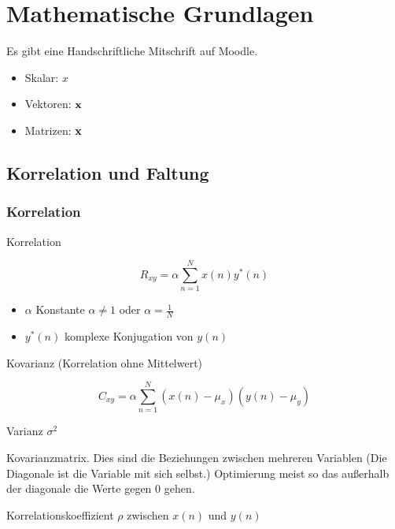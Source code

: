 \documentclass[a4paper]{article}
\title{\docTitle}
\author{Moritz}
\date{\today}
\begin{document}
\maketitle
\tableofcontents


\section{Mathematische Grundlagen}

Es gibt eine Handschriftliche Mitschrift auf Moodle.

\begin{itemize}
    \item Skalar: $x$
    \item Vektoren: $\mathbf{x}$
    \item Matrizen: $\mathbf{x}$
\end{itemize}

\subsection{Korrelation und Faltung}

\subsubsection{Korrelation}


Korrelation

$$R_{xy} = \alpha \sum_{n=1}^{N} x(n) y^*(n)$$

\begin{itemize}
    \item $\alpha$ Konstante $\alpha \neq 1$ oder $\alpha = \frac{1}{N}$
    \item $y^*(n)$ komplexe Konjugation von $y(n)$
\end{itemize}

Kovarianz (Korrelation ohne Mittelwert)

$$C_{xy} = \alpha \sum_{n=1}^{N} (x(n) -\mu_x)(y(n)-\mu_y)$$

Varianz $\sigma^2$

Kovarianzmatrix. Dies sind die Beziehungen zwischen mehreren Variablen (Die Diagonale ist die Variable mit sich selbst.) Optimierung meist so das außerhalb der diagonale die Werte gegen 0 gehen.

Korrelationskoeffizient $\rho$ zwischen $x(n)$ und $y(n)$
\end{document}
